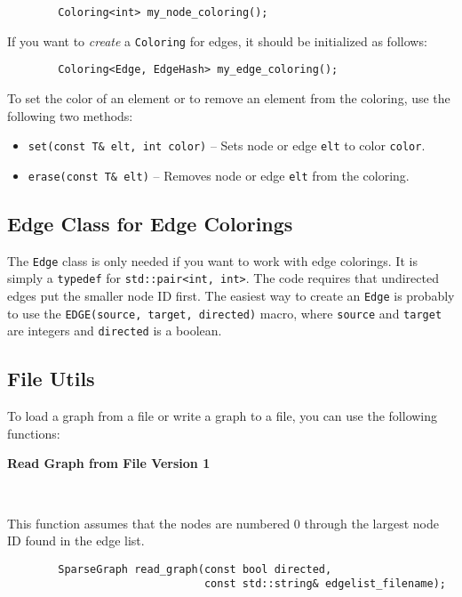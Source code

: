 \documentclass{article}
\begin{document}
\begin{verbatim}
        Coloring<int> my_node_coloring();
\end{verbatim}

If you want to \emph{create} a \verb|Coloring| for edges, it should be initialized as follows:

\begin{verbatim}
        Coloring<Edge, EdgeHash> my_edge_coloring();
\end{verbatim}

To set the color of an element or to remove an element from the coloring, use the following two methods:

\begin{itemize}
    \item \verb|set(const T& elt, int color)| -- Sets node or edge \verb|elt| to color \verb|color|.
    \item \verb|erase(const T& elt)| -- Removes node or edge \verb|elt| from the coloring.
\end{itemize}

\subsection{Edge Class for Edge Colorings}\label{sec:edge_class}

The \verb|Edge| class is only needed if you want to work with edge colorings. It is simply a \verb|typedef| for \verb|std::pair<int, int>|. The code requires that undirected edges put the smaller node ID first. The easiest way to create an \verb|Edge| is probably to use the \verb|EDGE(source, target, directed)| macro, where \verb|source| and \verb|target| are integers and \verb|directed| is a boolean.

\subsection{File Utils}\label{sec:file_utils}

To load a graph from a file or write a graph to a file, you can use the following functions:

\textbf{Read Graph from File Version 1}

\ 

This function assumes that the nodes are numbered 0 through the largest node ID found in the edge list.

\begin{verbatim}
        SparseGraph read_graph(const bool directed,
                               const std::string& edgelist_filename);
\end{verbatim}
\end{document}
